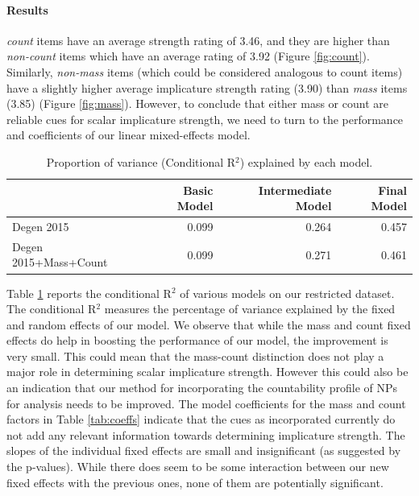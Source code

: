 \documentclass[10pt, biblatex, linguex]{report}
\begin{document}
\paragraph{Results} \textit{count} items have
an average strength rating of 3.46, and they are higher than \textit{non-count}
items which have an average rating of 3.92 (Figure \ref{fig:count}). Similarly,
\textit{non-mass} items (which could be considered analogous to count items) have
a slightly higher average implicature strength rating (3.90) than \textit{mass}
items (3.85) (Figure \ref{fig:mass}). However, to conclude that either {\rmsc mass} or {\rmsc count} are
reliable cues for scalar implicature strength, we need to turn to the performance
and coefficients of our linear mixed-effects model.

\begin{table}[t]
    \centering
    \begin{tabular}{lrrr}
         & Basic Model & Intermediate Model & Final Model  \\ \midrule
        Degen 2015 & 0.099 & 0.264 & 0.457 \\
        Degen 2015+Mass+Count & 0.099 & 0.271 & 0.461 \\
    \end{tabular}
    \caption{Proportion of variance (Conditional R$^2$) explained by each model.}
    \label{tab:models}
\end{table}

Table \ref{tab:models}
reports the conditional R$^2$ of various models on our restricted dataset. The
conditional R$^2$ measures the percentage of variance explained by the fixed and
random effects of our model. We observe that while the {\rmsc mass} and {\rmsc
count} fixed effects do help in boosting the performance of our model, the
improvement is very small. This could mean that the mass-count distinction does
not play a major role in determining scalar implicature strength. However this
could also be an indication that our method for incorporating the countability
profile of NPs for analysis needs to be improved. The model coefficients for the
{\rmsc mass} and {\rmsc count} factors in Table \ref{tab:coeffs} indicate that
the cues as incorporated currently do not add any relevant information towards
determining implicature strength. The slopes of the individual fixed effects are
small and insignificant (as suggested by the p-values). While there does seem to
be some interaction between our new fixed effects with the previous ones, none
of them are potentially significant.
\end{document}
